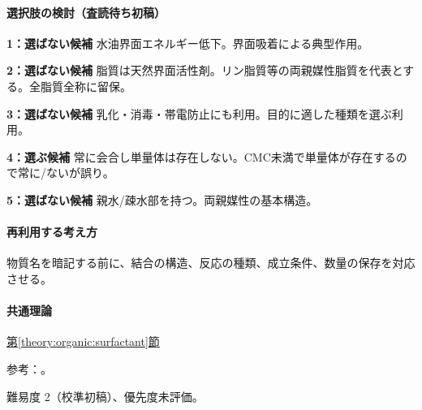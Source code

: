 \paragraph{選択肢の検討（査読待ち初稿）}\mbox{}\par

\noindent\textbf{1：選ばない候補} 水油界面エネルギー低下。界面吸着による典型作用。\par

\noindent\textbf{2：選ばない候補} 脂質は天然界面活性剤。リン脂質等の両親媒性脂質を代表とする。全脂質全称に留保。\par

\noindent\textbf{3：選ばない候補} 乳化・消毒・帯電防止にも利用。目的に適した種類を選ぶ利用。\par

\noindent\textbf{4：選ぶ候補} 常に会合し単量体は存在しない。CMC未満で単量体が存在するので常に/ないが誤り。\par

\noindent\textbf{5：選ばない候補} 親水/疎水部を持つ。両親媒性の基本構造。\par

\paragraph{再利用する考え方} 物質名を暗記する前に、結合の構造、反応の種類、成立条件、数量の保存を対応させる。

\paragraph{共通理論} \hyperref[theory:organic:surfactant]{第\ref*{theory:organic:surfactant}節}

\par 参考：\cite{organic_cmc}。

\par 難易度 2（校準初稿）、優先度未評価。
